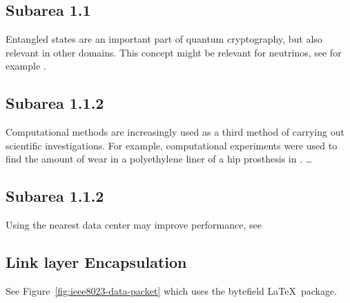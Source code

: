 \documentclass[nomenclature, english, biblatex]{kththesis}
\numberwithin{listing}{chapter}
\begin{document}
\subsection{Subarea 1.1}
Entangled states are an important part of quantum cryptography, but also relevant in other domains. This concept might be relevant for neutrinos, see for example \cite{kim_small-mass_2016}.

\subsection{Subarea 1.1.2}
Computational methods are increasingly used as a third method of carrying out
scientific investigations. For example, computational experiments were used to
find the amount of wear in a polyethylene liner of a hip prosthesis in \cite{maguire_jr_new_2014}.
…

\subsection{Subarea 1.1.2}
Using the nearest data center may improve performance, see \cite{bogdanov_nearest_2015}


\subsection{Link layer Encapsulation}
\label{sec:llencap}

See Figure~\ref{fig:ieee8023-data-packet} which uses the \textsf{bytefield}  \LaTeX\ package. 
\end{document}
